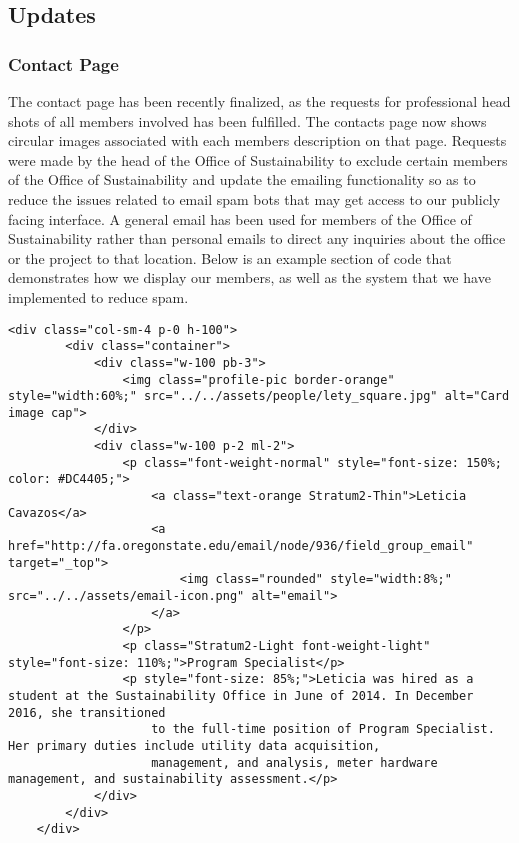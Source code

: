 \documentclass[letterpaper,10pt,serif,draftclsnofoot,onecolumn,compsoc,titlepage]{IEEEtran}
\begin{document}
\subsection{Updates}
\subsubsection{Contact Page}
The contact page has been recently finalized, as the requests for professional head shots of all members involved has been fulfilled. The contacts page now shows circular images associated with each members description on that page. Requests were made by the head of the Office of Sustainability to exclude certain members of the Office of Sustainability and update the emailing functionality so as to reduce the issues related to email spam bots that may get access to our publicly facing interface. A general email has been used for members of the Office of Sustainability rather than personal emails to direct any inquiries about the office or the project to that location.
Below is an example section of code that demonstrates how we display our members, as well as the system that we have implemented to reduce spam. 

\begin{lstlisting}
<div class="col-sm-4 p-0 h-100">
        <div class="container">
            <div class="w-100 pb-3">
                <img class="profile-pic border-orange" style="width:60%;" src="../../assets/people/lety_square.jpg" alt="Card image cap">
            </div>
            <div class="w-100 p-2 ml-2">
                <p class="font-weight-normal" style="font-size: 150%; color: #DC4405;">
                    <a class="text-orange Stratum2-Thin">Leticia Cavazos</a>
                    <a href="http://fa.oregonstate.edu/email/node/936/field_group_email" target="_top">
                        <img class="rounded" style="width:8%;" src="../../assets/email-icon.png" alt="email">
                    </a>
                </p>
                <p class="Stratum2-Light font-weight-light" style="font-size: 110%;">Program Specialist</p>
                <p style="font-size: 85%;">Leticia was hired as a student at the Sustainability Office in June of 2014. In December 2016, she transitioned
                    to the full-time position of Program Specialist. Her primary duties include utility data acquisition,
                    management, and analysis, meter hardware management, and sustainability assessment.</p>
            </div>
        </div>
    </div>
\end{lstlisting}
\end{document}

